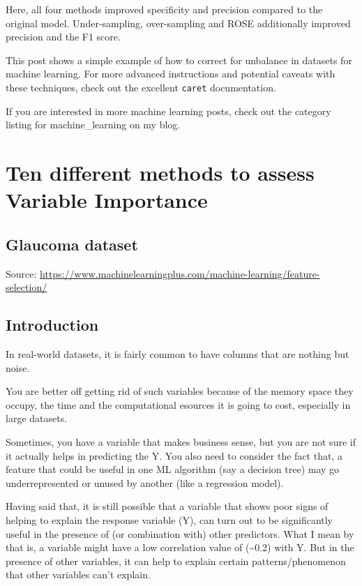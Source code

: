\documentclass[]{book}
\begin{document}
Here, all four methods improved specificity and precision compared to the original model. Under-sampling, over-sampling and ROSE additionally improved precision and the F1 score.

This post shows a simple example of how to correct for unbalance in datasets for machine learning. For more advanced instructions and potential caveats with these techniques, check out the excellent \texttt{caret} documentation.

If you are interested in more machine learning posts, check out the category listing for machine\_learning on my blog.

\hypertarget{ten-different-methods-to-assess-variable-importance}{%
\chapter{Ten different methods to assess Variable Importance}\label{ten-different-methods-to-assess-variable-importance}}

\hypertarget{glaucoma-dataset}{%
\section{Glaucoma dataset}\label{glaucoma-dataset}}

Source: \url{https://www.machinelearningplus.com/machine-learning/feature-selection/}

\hypertarget{introduction-2}{%
\section{Introduction}\label{introduction-2}}

In real-world datasets, it is fairly common to have columns that are nothing but noise.

You are better off getting rid of such variables because of the memory space they occupy, the time and the computational esources it is going to cost, especially in large datasets.

Sometimes, you have a variable that makes business sense, but you are not sure if it actually helps in predicting the Y. You also need to consider the fact that, a feature that could be useful in one ML algorithm (say a decision tree) may go underrepresented or unused by another (like a regression model).

Having said that, it is still possible that a variable that shows poor signs of helping to explain the response variable (Y), can turn out to be significantly useful in the presence of (or combination with) other predictors. What I mean by that is, a variable might have a low correlation value of (\textasciitilde{}0.2) with Y. But in the presence of other variables, it can help to explain certain patterns/phenomenon that other variables can't explain.
\end{document}
